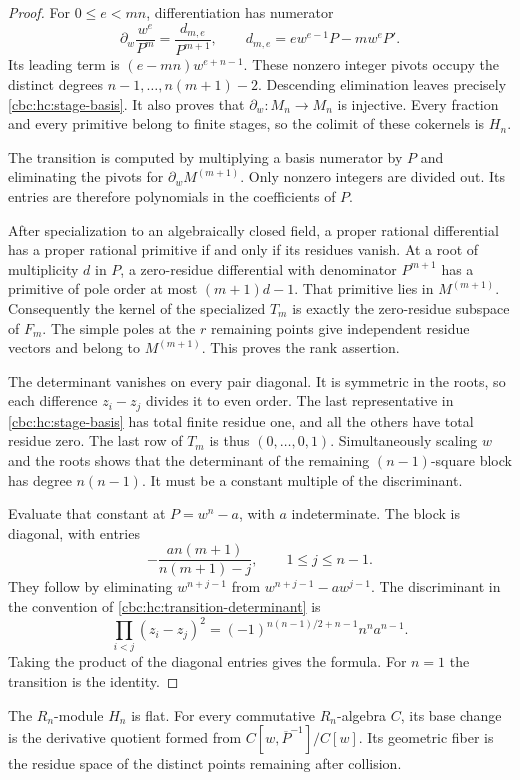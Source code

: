 \begin{proof}
For $0\leq e<mn$, differentiation has numerator
\[
 \partial_w\frac{w^e}{P^m}
 =\frac{d_{m,e}}{P^{m+1}},\qquad
 d_{m,e}=e w^{e-1}P-mw^eP'.
\]
Its leading term is $(e-mn)w^{e+n-1}$. These nonzero integer
pivots occupy the distinct degrees $n-1,\ldots,n(m+1)-2$.
Descending elimination leaves precisely
\eqref{cbc:hc:stage-basis}. It also proves that
$\partial_w:M_n\to M_n$ is injective. Every fraction and every
primitive belong to finite stages, so the colimit of these
cokernels is $H_n$.

The transition is computed by multiplying a basis numerator by
$P$ and eliminating the pivots for $\partial_wM^{(m+1)}$.
Only nonzero integers are divided out. Its entries are therefore
polynomials in the coefficients of $P$.

After specialization to an algebraically closed field, a proper
rational differential has a proper rational primitive if and only
if its residues vanish. At a root of multiplicity $d$ in $P$, a
zero-residue differential with denominator $P^{m+1}$ has a primitive
of pole order at most $(m+1)d-1$. That primitive lies in $M^{(m+1)}$.
Consequently the kernel of the specialized $T_m$ is exactly the
zero-residue subspace of $F_m$. The simple poles at the $r$
remaining points give independent residue vectors and belong to
$M^{(m+1)}$. This proves the rank assertion.

The determinant vanishes on every pair diagonal. It is symmetric
in the roots, so each difference $z_i-z_j$ divides it to even
order. The last representative in \eqref{cbc:hc:stage-basis} has
total finite residue one, and all the others have total residue
zero. The last row of $T_m$ is thus $(0,\ldots,0,1)$.
Simultaneously scaling $w$ and the roots shows that the determinant
of the remaining $(n-1)$-square block has degree $n(n-1)$.
It must be a constant multiple of the discriminant.

Evaluate that constant at $P=w^n-a$, with $a$ indeterminate.
The block is diagonal, with
entries
\[
 -\frac{an(m+1)}{n(m+1)-j},\qquad 1\leq j\leq n-1.
\]
They follow by eliminating $w^{n+j-1}$ from
$w^{n+j-1}-aw^{j-1}$. The discriminant in the convention
of \eqref{cbc:hc:transition-determinant} is
\[
 \prod_{i<j}(z_i-z_j)^2
 =(-1)^{n(n-1)/2+n-1}n^na^{n-1}.
\]
Taking the product of the diagonal entries gives the formula.
For $n=1$ the transition is the identity.
\end{proof}

\begin{corollary}\label{cbc:hc:flat}
The $R_n$-module $H_n$ is flat. For every commutative
$R_n$-algebra $C$, its base change is the derivative quotient
formed from $C[w,\overline P^{-1}]/C[w]$.
Its geometric fiber is the residue space of the distinct points
remaining after collision.
\end{corollary}

